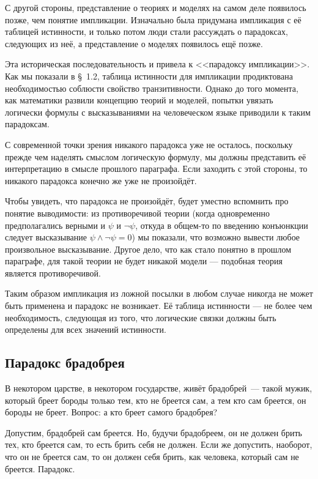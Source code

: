 С другой стороны, представление о теориях и моделях на самом деле появилось позже, чем понятие импликации. Изначально была придумана импликация с её таблицей истинности, и только потом люди стали рассуждать о парадоксах, следующих из неё, а представление о моделях появилось ещё позже.

Эта историческая последовательность и привела к  <<парадоксу импликации>>. Как мы показали в \S~1.2, таблица истинности для импликации продиктована необходимостью соблюсти свойство транзитивности. Однако до того момента, как математики развили концепцию теорий и моделей, попытки увязать логически формулы с высказываниями на человеческом языке приводили к таким парадоксам.

С современной точки зрения никакого парадокса уже не осталось, поскольку прежде чем наделять смыслом логическую формулу, мы должны представить её интерпретацию в смысле прошлого параграфа. Если заходить с этой  стороны, то никакого парадокса конечно же уже не произойдёт.

Чтобы увидеть, что парадокса не произойдёт, будет уместно вспомнить про понятие выводимости: из противоречивой теории (когда одновременно предполагались верными и $\psi$ и $\neg\psi$, откуда в общем-то по введению конъюнкции следует высказывание $\psi\wedge\neg\psi=0$) мы показали, что возможно вывести любое произвольное высказывание. Другое дело, что как стало понятно в прошлом параграфе, для такой теории не будет никакой модели — подобная теория является противоречивой.

Таким образом импликация из ложной посылки в любом случае никогда не может быть применена и парадокс не возникает. Её таблица истинности — не более чем необходимость, следующая из того, что логические связки должны быть определены для всех значений истинности.

\subsection{Парадокс брадобрея}

В некотором царстве, в некотором государстве, живёт брадобрей~--- такой мужик, который бреет бороды только тем, кто не бреется сам, а тем кто сам бреется, он бороды не бреет. Вопрос: а кто бреет самого брадобрея?

Допустим, брадобрей сам бреется. Но, будучи брадобреем, он не должен брить тех, кто бреется сам, то есть брить себя не должен. Если же допустить, наоборот, что он не бреется сам, то он должен себя брить, как человека, который сам не бреется. Парадокс.

